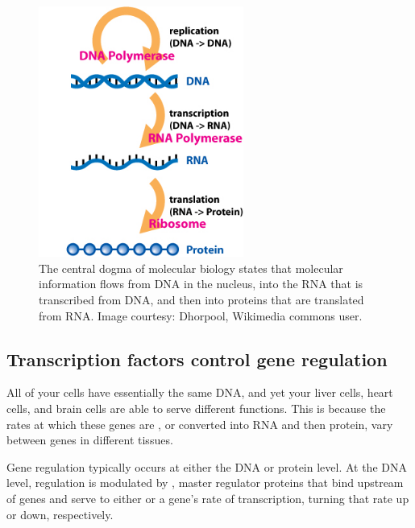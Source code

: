 \begin{figure}[h]
\centering
\mySfFamily
\includegraphics[width = 0.6\textwidth]{../assets/images/600px/Central_Dogma_of_Molecular_Biochemistry_with_Enzymes.jpg}
\caption{The central dogma of molecular biology states that molecular information flows from DNA in the nucleus, into the RNA that is transcribed from DNA, and then into proteins that are translated from RNA. Image courtesy: Dhorpool, Wikimedia commons user.}
\label{fig:Central_Dogma_of_Molecular_Biochemistry_with_Enzymes}
\end{figure}

\FloatBarrier
{}
\subsection{Transcription factors control gene regulation}

All of your cells have essentially the same DNA, and yet your liver cells, heart cells, and brain cells are able to serve different functions. This is because the rates at which these genes are , or converted into RNA and then protein, vary between genes in different tissues.

Gene regulation typically occurs at either the DNA or protein level. At the DNA level, regulation is modulated by , master regulator proteins that bind upstream of genes and serve to either  or  a gene's rate of transcription, turning that rate up or down, respectively.

